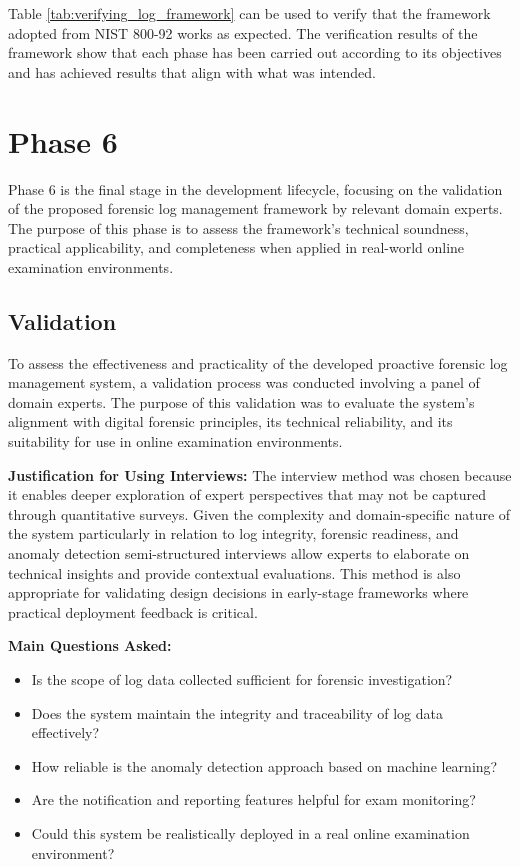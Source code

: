 Table \ref{tab:verifying_log_framework} can be used to verify that the framework adopted from NIST 800-92 works as expected. The verification results of the framework show that each phase has been carried out according to its objectives and has achieved results that align with what was intended.



\section{Phase 6}
Phase 6 is the final stage in the development lifecycle, focusing on the validation of the proposed forensic log management framework by relevant domain experts. The purpose of this phase is to assess the framework’s technical soundness, practical applicability, and completeness when applied in real-world online examination environments.


\subsection{Validation}
To assess the effectiveness and practicality of the developed proactive forensic log management system, a validation process was conducted involving a panel of domain experts. The purpose of this validation was to evaluate the system's alignment with digital forensic principles, its technical reliability, and its suitability for use in online examination environments.

\textbf{Justification for Using Interviews:}  
The interview method was chosen because it enables deeper exploration of expert perspectives that may not be captured through quantitative surveys. Given the complexity and domain-specific nature of the system particularly in relation to log integrity, forensic readiness, and anomaly detection semi-structured interviews allow experts to elaborate on technical insights and provide contextual evaluations. This method is also appropriate for validating design decisions in early-stage frameworks where practical deployment feedback is critical.

\textbf{Main Questions Asked:}
\begin{itemize}
	\item Is the scope of log data collected sufficient for forensic investigation?
	\item Does the system maintain the integrity and traceability of log data effectively?
	\item How reliable is the anomaly detection approach based on machine learning?
	\item Are the notification and reporting features helpful for exam monitoring?
	\item Could this system be realistically deployed in a real online examination environment?
\end{itemize}

